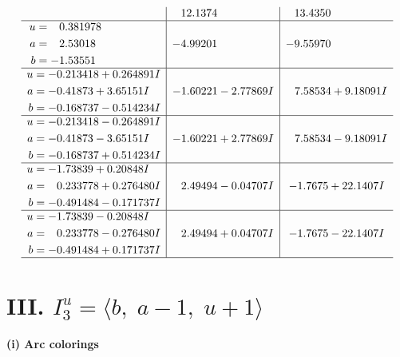 \documentclass[1p]{elsarticle_modified}
\theoremstyle{definition}
\begin{document}
$$\begin{array}{c|c|c}
 & \phantom{-}12.1374\phantom{ +0.000000I} & \phantom{-}13.4350\phantom{ +0.000000I} \\ \hline\begin{aligned}
u &= \phantom{-}0.381978\phantom{ +0.000000I} \\
a &= \phantom{-}2.53018\phantom{ +0.000000I} \\
b &= -1.53551\phantom{ +0.000000I}\end{aligned}
 & -4.99201\phantom{ +0.000000I} & -9.55970\phantom{ +0.000000I} \\ \hline\begin{aligned}
u &= -0.213418 + 0.264891 I \\
a &= -0.41873 + 3.65151 I \\
b &= -0.168737 - 0.514234 I\end{aligned}
 & -1.60221 - 2.77869 I & \phantom{-}7.58534 + 9.18091 I \\ \hline\begin{aligned}
u &= -0.213418 - 0.264891 I \\
a &= -0.41873 - 3.65151 I \\
b &= -0.168737 + 0.514234 I\end{aligned}
 & -1.60221 + 2.77869 I & \phantom{-}7.58534 - 9.18091 I \\ \hline\begin{aligned}
u &= -1.73839 + 0.20848 I \\
a &= \phantom{-}0.233778 + 0.276480 I \\
b &= -0.491484 - 0.171737 I\end{aligned}
 & \phantom{-}2.49494 - 0.04707 I & -1.7675 + 22.1407 I \\ \hline\begin{aligned}
u &= -1.73839 - 0.20848 I \\
a &= \phantom{-}0.233778 - 0.276480 I \\
b &= -0.491484 + 0.171737 I\end{aligned}
 & \phantom{-}2.49494 + 0.04707 I & -1.7675 - 22.1407 I\\
 \hline 
 \end{array}$$\newpage\newpage\renewcommand{\arraystretch}{1}
\centering \section*{III. $I^u_{3}= \langle b,\;a-1,\;u+1 \rangle$}
\flushleft \textbf{(i) Arc colorings}\\
\end{document}
